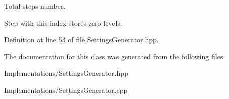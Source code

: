 Total steps number. 

Step with this index stores zero levels. 

Definition at line 53 of file Settings\+Generator.\+hpp.



The documentation for this class was generated from the following files\+:\begin{DoxyCompactItemize}
\item 
Implementations/Settings\+Generator.\+hpp\item 
Implementations/Settings\+Generator.\+cpp\end{DoxyCompactItemize}

